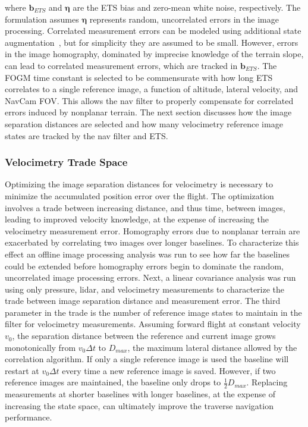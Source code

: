 \noindent where $\bm{b}_{ETS}$ and $\bm{\eta}$ are the ETS bias and zero-mean white noise, respectively. The formulation assumes $\bm{\eta}$ represents random, uncorrelated errors in the image processing. Correlated measurement errors can be modeled using additional state augmentation~\cite{mourikis}, but for simplicity they are assumed to be small. However, errors in the image homography, dominated by imprecise knowledge of the terrain slope, can lead to correlated measurement errors, which are tracked in $\bm{b}_{ETS}$. The \ac{FOGM} time constant is selected to be commensurate with how long \ac{ETS} correlates to a single reference image, a function of altitude, lateral velocity, and \ac{NavCam} FOV. This allows the nav filter to properly compensate for correlated errors induced by nonplanar terrain. The next section discusses how the image separation distances are selected and how many velocimetry reference image states are tracked by the nav filter and ETS. 

\subsubsection{Velocimetry Trade Space}

Optimizing the image separation distances for velocimetry is necessary to minimize the accumulated position error over the flight. The optimization involves a trade between increasing distance, and thus time, between images, leading to improved velocity knowledge, at the expense of increasing the velocimetry measurement error. Homography errors due to nonplanar terrain 
are exacerbated by correlating two images over longer baselines. To characterize this effect an offline image processing analysis was run to see how far the baselines could be extended before homography errors begin to dominate the random, uncorrelated image processing errors. Next, a linear covariance analysis was run using only pressure, lidar, and velocimetry measurements to characterize the trade between image separation distance and measurement error. The third parameter in the trade is the number of reference image states to maintain in the filter for velocimetry measurements. Assuming forward flight at constant velocity $v_{0}$, the separation distance between the reference and current image grows monotonically from $v_{0} \Delta t$ to $D_{max}$, the maximum lateral distance allowed by the correlation algorithm. If only a single reference image is used the baseline will restart at $v_{0} \Delta t$ every time a new reference image is saved. However, if two reference images are maintained, the baseline only drops to $\frac{1}{2}D_{max}$. Replacing measurements at shorter baselines with longer baselines, at the expense of increasing the state space, can ultimately improve the traverse navigation performance.   

